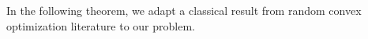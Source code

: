 %
In the following theorem, we adapt a classical result from random convex optimization literature to our problem.



